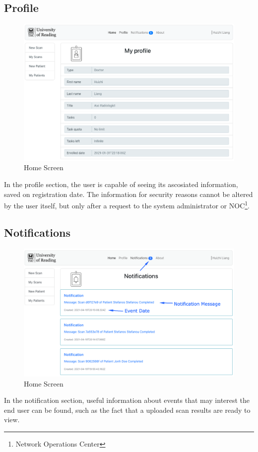 		\subsection{Profile}
			\begin{figure}[H]
				\iftrue
				\centering
				\caption{Home Screen}
				\includegraphics[scale=0.3]{figures/profile}
				\fi
			\end{figure}
			In the profile section, the user is capable of seeing its ascosiated information, saved on registration date. The information for security
			reasons cannot be altered by the user itself, but only after a request to the system administrator or NOC\footnote{Network Operations Center}.
		\subsection{Notifications}
			\begin{figure}[H]
				\iftrue
				\centering
				\caption{Home Screen}
				\includegraphics[scale=0.3]{figures/notifications}
				\fi
			\end{figure}
			In the notification section, useful information about events that may interest the end user can be found, such as the fact that
			a uploaded scan results are ready to view. 
